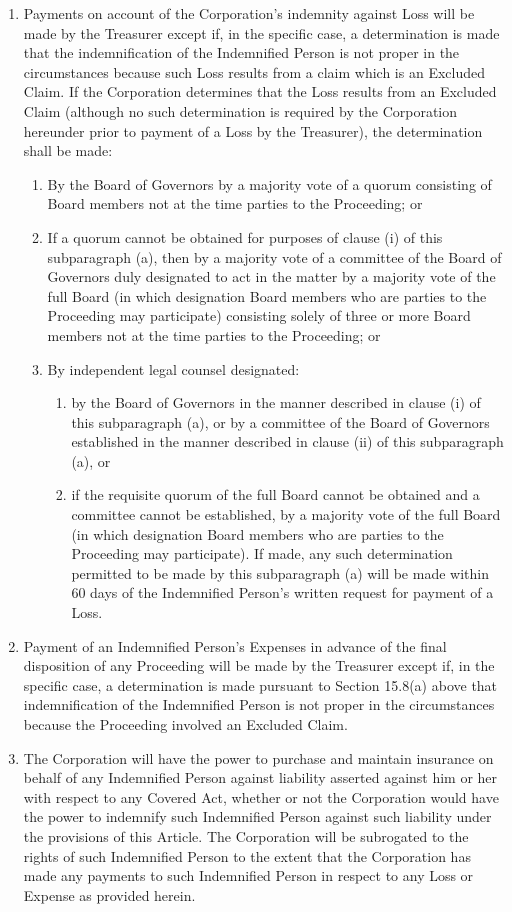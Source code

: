 \documentclass[11pt,american,letterpaper,]{constitution}
\begin{document}
\begin{enumerate}
\item Payments on account of the Corporation's indemnity against Loss will be made by the Treasurer except if, in the specific case, a determination is made that the indemnification of the Indemnified Person is not proper in the circumstances because such Loss results from a claim which is an Excluded Claim. If the Corporation determines that the Loss results from an Excluded Claim (although no such determination is required by the Corporation hereunder prior to payment of a Loss by the Treasurer), the determination shall be made: 
\begin{enumerate}
	\item By the Board of Governors by a majority vote of a quorum consisting of Board members not at the time parties to the Proceeding; or
	\item If a quorum cannot be obtained for purposes of clause (i) of this subparagraph (a), then by a majority vote of a committee of the Board of Governors duly designated to act in the matter by a majority vote of the full Board (in which designation Board members who are parties to the Proceeding may participate) consisting solely of three or more Board members not at the time parties to the Proceeding; or
	\item By independent legal counsel designated: 
	\begin{enumerate}
		\item by the Board of Governors in the manner described in clause (i) of this subparagraph (a), or by a committee of the Board of Governors established in the manner described in clause (ii) of this subparagraph (a), or
		\item if the requisite quorum of the full Board cannot be obtained and a committee cannot be established, by a majority vote of the full Board (in which designation Board members who are parties to the Proceeding may participate). If made, any such determination permitted to be made by this subparagraph (a) will be made within 60 days of the Indemnified Person's written request for payment of a Loss. 
	\end{enumerate}
\end{enumerate}
\item Payment of an Indemnified Person's Expenses in advance of the final disposition of any Proceeding will be made by the Treasurer except if, in the specific case, a determination is made pursuant to Section 15.8(a) above that indemnification of the Indemnified Person is not proper in the circumstances because the Proceeding involved an Excluded Claim. 
\item The Corporation will have the power to purchase and maintain insurance on behalf of any Indemnified Person against liability asserted against him or her with respect to any Covered Act, whether or not the Corporation would have the power to indemnify such Indemnified Person against such liability under the provisions of this Article. The Corporation will be subrogated to the rights of such Indemnified Person to the extent that the Corporation has made any payments to such Indemnified Person in respect to any Loss or Expense as provided herein.
\end{enumerate}
\end{document}
